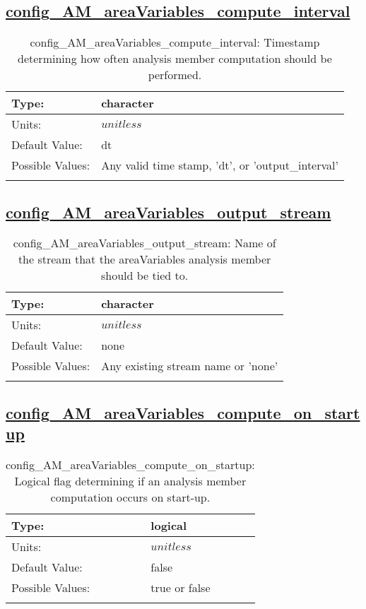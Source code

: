 \subsection[config\_AM\_areaVariables\_compute\_interval]{\hyperref[sec:nm_tab_AM_areaVariables]{config\_AM\_areaVariables\_compute\_interval}}
\label{subsec:nm_sec_config_AM_areaVariables_compute_interval}
\begin{center}
\begin{longtable}{| p{2.0in} || p{4.0in} |}
    \hline
    Type: & character \\
    \hline
    Units: & $unitless$ \\
    \hline
    Default Value: & dt \\
    \hline
    Possible Values: & Any valid time stamp, 'dt', or 'output\_interval' \\
    \hline
    \caption{config\_AM\_areaVariables\_compute\_interval: Timestamp determining how often analysis member computation should be performed.}
\end{longtable}
\end{center}
\subsection[config\_AM\_areaVariables\_output\_stream]{\hyperref[sec:nm_tab_AM_areaVariables]{config\_AM\_areaVariables\_output\_stream}}
\label{subsec:nm_sec_config_AM_areaVariables_output_stream}
\begin{center}
\begin{longtable}{| p{2.0in} || p{4.0in} |}
    \hline
    Type: & character \\
    \hline
    Units: & $unitless$ \\
    \hline
    Default Value: & none \\
    \hline
    Possible Values: & Any existing stream name or 'none' \\
    \hline
    \caption{config\_AM\_areaVariables\_output\_stream: Name of the stream that the areaVariables analysis member should be tied to.}
\end{longtable}
\end{center}
\subsection[config\_AM\_areaVariables\_compute\_on\_startup]{\hyperref[sec:nm_tab_AM_areaVariables]{config\_AM\_areaVariables\_compute\_on\_startup}}
\label{subsec:nm_sec_config_AM_areaVariables_compute_on_startup}
\begin{center}
\begin{longtable}{| p{2.0in} || p{4.0in} |}
    \hline
    Type: & logical \\
    \hline
    Units: & $unitless$ \\
    \hline
    Default Value: & false \\
    \hline
    Possible Values: & true or false \\
    \hline
    \caption{config\_AM\_areaVariables\_compute\_on\_startup: Logical flag determining if an analysis member computation occurs on start-up.}
\end{longtable}
\end{center}
